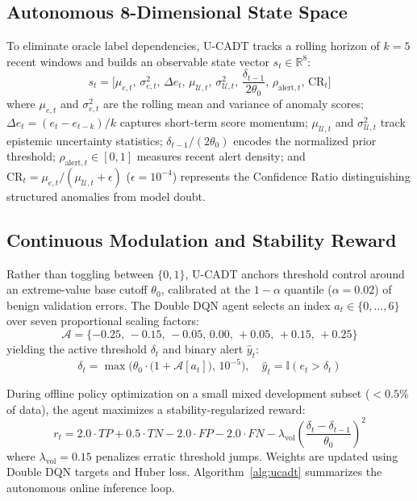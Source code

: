 \documentclass[conference]{IEEEtran}
\begin{document}
\subsection{Autonomous 8-Dimensional State Space}
To eliminate oracle label dependencies, U-CADT tracks a rolling horizon of $k = 5$ recent windows and builds an observable state vector $s_t \in \mathbb{R}^8$:
\begin{equation}
s_t = \Big[ \mu_{e,t}, \, \sigma_{e,t}^2, \, \Delta e_t, \, \mu_{\mathcal{U},t}, \, \sigma_{\mathcal{U},t}^2, \, \frac{\delta_{t-1}}{2\theta_0}, \, \rho_{\text{alert},t}, \, \text{CR}_t \Big]
\end{equation}
where $\mu_{e,t}$ and $\sigma_{e,t}^2$ are the rolling mean and variance of anomaly scores; $\Delta e_t = (e_t - e_{t-k}) / k$ captures short-term score momentum; $\mu_{\mathcal{U},t}$ and $\sigma_{\mathcal{U},t}^2$ track epistemic uncertainty statistics; $\delta_{t-1}/(2\theta_0)$ encodes the normalized prior threshold; $\rho_{\text{alert},t} \in [0, 1]$ measures recent alert density; and $\text{CR}_t = \mu_{e,t} / (\mu_{\mathcal{U},t} + \epsilon)$ ($\epsilon = 10^{-4}$) represents the Confidence Ratio distinguishing structured anomalies from model doubt.

\subsection{Continuous Modulation and Stability Reward}
Rather than toggling between $\{0, 1\}$, U-CADT anchors threshold control around an extreme-value base cutoff $\theta_0$, calibrated at the $1 - \alpha$ quantile ($\alpha = 0.02$) of benign validation errors. The Double DQN agent selects an index $a_t \in \{0, \dots, 6\}$ over seven proportional scaling factors:
\begin{equation}
\mathcal{A} = \{-0.25, \, -0.15, \, -0.05, \, 0.00, \, +0.05, \, +0.15, \, +0.25\}
\end{equation}
yielding the active threshold $\delta_t$ and binary alert $\hat{y}_t$:
\begin{equation}
\delta_t = \max\Big( \theta_0 \cdot \big(1 + \mathcal{A}[a_t]\big), \, 10^{-5} \Big), \quad \hat{y}_t = \mathbb{I}(e_t > \delta_t)
\end{equation}

During offline policy optimization on a small mixed development subset ($<0.5\%$ of data), the agent maximizes a stability-regularized reward:
\begin{equation}
r_t = 2.0 \cdot TP + 0.5 \cdot TN - 2.0 \cdot FP - 2.0 \cdot FN - \lambda_{\text{vol}} \left( \frac{\delta_t - \delta_{t-1}}{\theta_0} \right)^2
\end{equation}
where $\lambda_{\text{vol}} = 0.15$ penalizes erratic threshold jumps. Weights are updated using Double DQN targets and Huber loss. Algorithm~\ref{alg:ucadt} summarizes the autonomous online inference loop.
\end{document}
